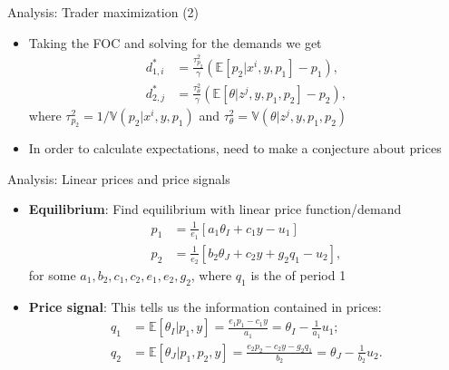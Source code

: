 \documentclass[english,10pt
,aspectratio=169
]{beamer}
\begin{document}
\begin{frame}{Analysis: Trader maximization (2)}
	\begin{itemize}
		\item Taking the FOC and solving for the demands we get 
		\begin{align}
			d^*_{1,i} &= \frac{\tau^2_{p_2}}{\gamma}(\mathbb{E}[p_2| x^i, y, p_1]-p_1), \label{eqfoc1} \\
			d^*_{2,j} &= \frac{\tau^2_\theta}{\gamma} (\mathbb{E}[\theta| z^j, y, p_1, p_2]-p_2), \label{eqfoc2}
		\end{align}
		where $\tau^2_{p_2}=1/\mathbb{V}(p_2| x^i, y, p_1)$ and $\tau^2_{\theta}=\mathbb{V}(\theta| z^j, y, p_1, p_2)$
		\item In order to calculate expectations, need to make a conjecture about prices
	\end{itemize}
\end{frame}


\begin{frame}{Analysis: Linear prices and price signals}
	\begin{itemize}
		\item \textbf{Equilibrium}: Find equilibrium with linear price function/demand
		\begin{align}
			p_1 & = \frac{1}{e_1}\left[a_1 \theta_I + c_1 y - u_1 \right]\label{price1}\\
			p_2 & =\frac{1}{e_2}\left[ b_2 \theta_J + c_2 y +  g_2 q_1-u_2 \right], \label{price2}
		\end{align}
		for some $a_1,b_2,c_1,c_2,e_1,e_2,g_2$, 
		where $q_1$ is the  of period 1
		\item \textbf{Price signal}: This tells us the information contained in prices:
		\begin{align}
			q_1 & = \mathbb{E}[\theta_I|p_1,y]= \frac{e_1 p_1-c_1 y}{a_1} = \theta_I - \frac{1}{a_1} u_1 ; \label{signal1} \\
			q_2 &=\mathbb{E}[\theta_J|p_1,p_2,y]= \frac{e_2 p_2-c_2 y - g_2 q_1}{b_2} = \theta_J - \frac{1}{b_2} u_2. \label{signal2}
		\end{align}
	\end{itemize}
\end{frame}
\end{document}
